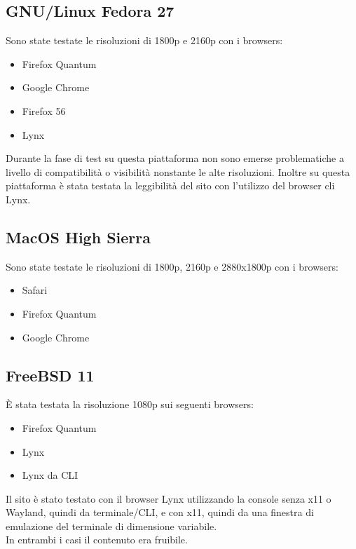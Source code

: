 \documentclass[openany, a4paper, 12pt]{report}
\begin{document}
				\subsection{GNU/Linux Fedora 27}
				Sono state testate le risoluzioni di 1800p e 2160p con i browsers:
				\begin{itemize}
					\item Firefox Quantum
					\item Google Chrome
					\item Firefox 56
					\item Lynx
				\end{itemize}
				Durante la fase di test su questa piattaforma non sono emerse problematiche a livello di compatibilità o visibilità nonstante le alte risoluzioni. Inoltre su questa piattaforma è stata testata la leggibilità del sito con l'utilizzo del browser cli Lynx.

				\subsection{MacOS High Sierra}
				Sono state testate le risoluzioni di 1800p, 2160p e 2880x1800p con i browsers:
				\begin{itemize}
					\item Safari
					\item Firefox Quantum
					\item Google Chrome
				\end{itemize}

				\subsection{FreeBSD 11}
				\`{E} stata testata la risoluzione 1080p sui seguenti browsers:
				\begin{itemize}
					\item Firefox Quantum
					\item Lynx
					\item Lynx da CLI
				\end{itemize}
				Il sito è stato testato con il browser Lynx utilizzando la console senza x11 o Wayland, quindi da terminale/CLI, e con x11, quindi da una finestra di emulazione del terminale di dimensione variabile.\\
				In entrambi i casi il contenuto era fruibile.
\end{document}

